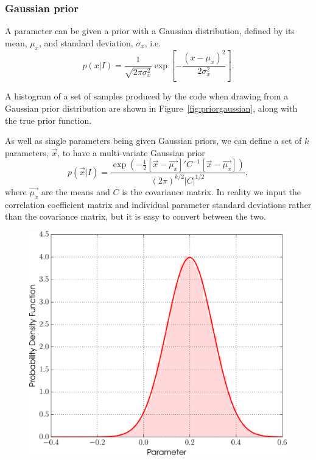 \subsubsection{Gaussian prior}\label{sec:gaussianprior}

A parameter can be given a prior with a Gaussian distribution, defined by its mean, $\mu_x$, and standard deviation, $\sigma_x$, i.e.\
\begin{equation}
 p(x|I) = \frac{1}{\sqrt{2\pi\sigma_x^2}}\exp{\left[-\frac{(x-\mu_x)^2}{2\sigma_x^2}\right]}.
\end{equation}

A histogram of a set of samples produced by the code when drawing from a Gaussian prior distribution are shown in Figure~\ref{fig:priorgaussian},
along with the true prior function.

As well as single parameters being given Gaussian priors, we can define a set of $k$ parameters, $\vec{x}$, to have a multi-variate Gaussian prior
\begin{equation}
 p(\vec{x}|I) = \frac{\exp{\left(-\frac{1}{2}[\vec{x}-\vec{\mu_x}]'C^{-1}[\vec{x}-\vec{\mu_x}] \right)}}{(2\pi)^{k/2}|C|^{1/2}},
\end{equation}
where $\vec{\mu_x}$ are the means and $C$ is the covariance matrix. In reality we input the correlation coefficient matrix and individual
parameter standard deviations rather than the covariance matrix, but it is easy to convert between the two.

\begin{figure}[!phtb]
\begin{center}
\includegraphics[width=1\columnwidth]{./figures/priors/gaussian/gaussian}
\caption{ \protect}
\end{center}
\end{figure}

